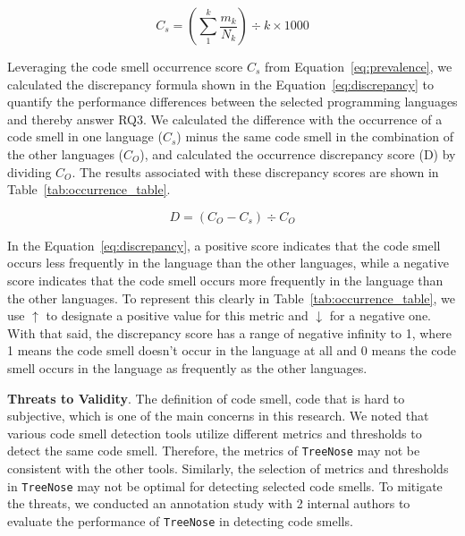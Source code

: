 
\begin{equation}
C_{s} = \left( \sum_{1}^{k}{\frac{m_{k}}{N_{k}}} \right) \div k \times 1000
\label{eq:prevalence}
\end{equation}


Leveraging the code smell occurrence score $C_{s}$ from
Equation~\ref{eq:prevalence}, we calculated the discrepancy formula shown in the
Equation~\ref{eq:discrepancy} to quantify the performance differences between
the selected programming languages and thereby answer RQ3.
%
We calculated the difference with the occurrence of a code smell in one language
($C_{s}$) minus the same code smell in the combination of the other languages
($C_{O}$), and calculated the occurrence discrepancy score (D) by dividing
$C_{O}$. The results associated with these discrepancy scores are shown in
Table~\ref{tab:occurrence_table}.


\begin{equation}
    D = (C_{O} - C_{s}) \div C_{O}
    \label{eq:discrepancy}
\end{equation}

In the Equation~\ref{eq:discrepancy}, a positive score indicates that the code
smell occurs less frequently in the language than the other languages, while a
negative score indicates that the code smell occurs more frequently in the
language than the other languages.
%
To represent this clearly in Table~\ref{tab:occurrence_table}, we use $\uparrow$
to designate a positive value for this metric and $\downarrow$ for a negative
one.
%
With that said, the discrepancy score has a range of negative infinity to 1,
where 1 means the code smell doesn't occur in the language at all and 0 means
the code smell occurs in the language as frequently as the other languages.

{\bf Threats to Validity}. The definition of code smell, code that is hard to
subjective, which is one of the main concerns in this research.
We noted that various code smell detection tools
utilize different metrics and thresholds to detect the same code smell.
Therefore, the metrics of \texttt{TreeNose} may not be consistent with the
other tools. Similarly, the selection of metrics and thresholds in
\texttt{TreeNose} may not be optimal for detecting selected code smells. To
mitigate the threats, we conducted an annotation study with 2 internal authors to
evaluate the performance of \texttt{TreeNose} in detecting code smells.

